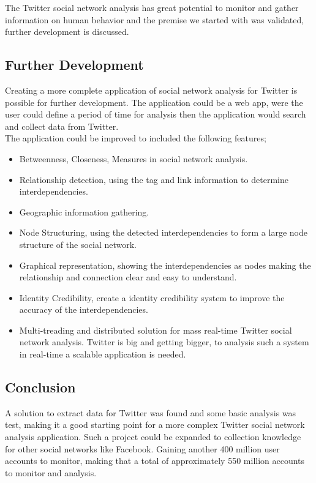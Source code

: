 \documentclass[]{article}  %
\begin{document}
The Twitter social network analysis has great potential to monitor and gather information on human behavior and the premise we started with was validated, further development is discussed. 

\subsection{Further Development}

Creating a more complete application of social network analysis for Twitter is possible for further development. The application could be a web app, were the user could define a period of time for analysis then the application would search and collect data from Twitter. \\ The application could be improved to included the following features;

\begin{itemize}
	\item Betweenness, Closeness, Measures in social network analysis.
	\item Relationship detection, using the tag and link information to determine interdependencies.
	\item Geographic information gathering.
	\item Node Structuring, using the detected interdependencies to form a large node structure of the social network.
	\item Graphical representation, showing the interdependencies as nodes making the relationship and connection clear and easy to understand.
	\item Identity Credibility, create a identity credibility system to improve the accuracy of the interdependencies.
	\item Multi-treading and distributed solution for mass real-time Twitter social network analysis. Twitter is big and getting bigger, to analysis such a system in real-time a scalable application is needed.
\end{itemize}

\subsection{Conclusion}

A solution to extract data for Twitter was found and some basic analysis was test, making it a good starting point for a more complex Twitter social network analysis application. Such a project could be expanded to collection knowledge for other social networks like Facebook. Gaining another 400 million user accounts to monitor, making that a total of approximately 550 million accounts to monitor and analysis.

\nocite{bib1} 
\nocite{bib2}
\nocite{bib3}
\nocite{bib4}
\nocite{bib5}
\nocite{bib6}
\nocite{bib7}
\nocite{bib8}
\nocite{bib9}
\nocite{bib10}
\nocite{bib11}
\nocite{bib12}
\nocite{bib13}




\end{document}
